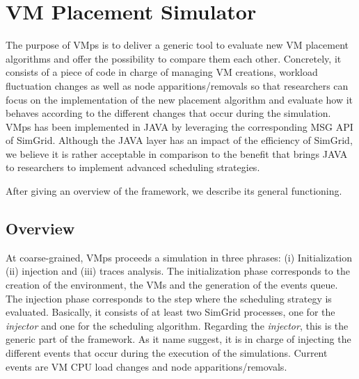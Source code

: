 \documentclass[conference]{IEEEtran}
\newcommand{\sg}{SimGrid\xspace}
\newcommand{\vmps}{VMps\xspace}
\begin{document}
\section{VM Placement Simulator}
\label{sec:injector}

The purpose of \vmps is to deliver a generic tool
to evaluate new VM placement algorithms and offer the possibility to
compare them each other. Concretely, it consists of a piece of code in
charge of managing VM creations, workload fluctuation changes as well
as node apparitions/removals so that researchers can focus on the
implementation of the new placement algorithm and evaluate how it
behaves according to the different changes that occur during the
simulation.
%
\vmps has been implemented in JAVA by
leveraging the corresponding MSG API of \sg.  Although the JAVA layer
has an impact of the efficiency of \sg, we believe it is rather
acceptable in comparison to the benefit that brings JAVA  to researchers to
implement advanced scheduling strategies.

After giving an overview of the framework, we describe  its general
functioning.%

\subsection{Overview}
\label{sec:overview}

At coarse-grained, \vmps proceeds a simulation in three
phrases: (i) Initialization (ii) injection and (iii) traces analysis.
The initialization phase corresponds to the creation of the
environment, the VMs and the generation of the events queue. The
injection phase corresponds to the step where the scheduling strategy
is evaluated. Basically, it consists of at least two \sg processes,
one for the \emph{injector} and one for the scheduling algorithm.
Regarding the \emph{injector}, this is the generic part of the
framework. As it name suggest, it is in charge of injecting the
different events that occur during the execution of the simulations.
Current events are VM CPU load changes and node apparitions/removals.
\end{document}
